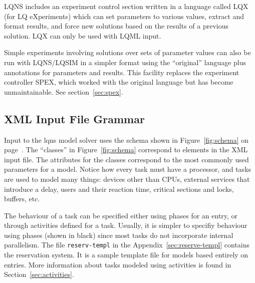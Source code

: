 \documentclass[11pt]{article}
\begin{document}
LQNS includes an experiment control section written in a language called LQX (for LQ
eXperiments) which can set parameters to various values, extract and format results, and force new
solutions based on the results of a previous solution. LQX can only be
used with LQML input.

Simple experiments involving solutions over sets of parameter values can also be run with
LQNS/LQSIM in a simpler format using the ``original'' language plus annotations for parameters
and results. This facility replaces the experiment controller SPEX, which worked with the original
language but has become unmaintainable. See section~\ref{sec:spex}.

\subsection{XML Input File Grammar}
\label{sec:xml-grammar}

Input to the lqns model solver uses the schema shown in
Figure~\ref{fig:schema} on page~\pageref{fig:schema}.  The ``classes'' in
Figure~\ref{fig:schema} correspond to elements in the XML input file.
The attributes for the classes correspond to the most commonly used
parameters for a model.  Notice how every task must have a processor,
and tasks are used to model many things: devices other than CPUs,
external services that introduce a delay, users and their reaction
time, critical sections and locks, buffers, etc.

The behaviour of a task can be specified either using phases for an
entry, or through activities defined for a task.  Usually, it is
simpler to specifiy behaviour using phases (shown in black) since most
tasks do not incorporate internal parallelism.  The file
\texttt{reserv-templ} in the
Appendix~\ref{sec:reserve-templ} contains the reservation system.
It is a sample template file for models based entirely on entries.
More information about tasks modeled using activities is found in
Section~\ref{sec:activities}. 
\end{document}

